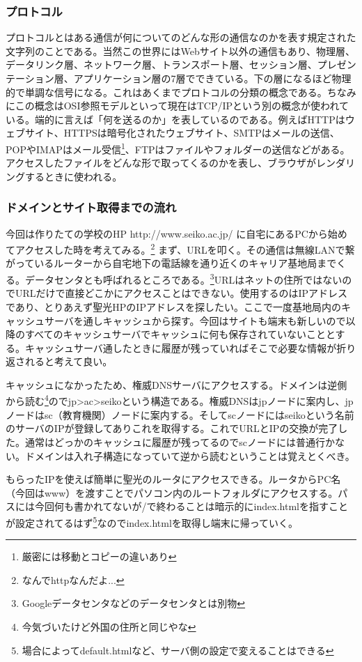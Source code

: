 \documentclass[dvipdfmx,jb5]{jarticle}
\begin{document}
\subsubsection{プロトコル}
プロトコルとはある通信が何についてのどんな形の通信なのかを表す規定された文字列のことである。当然この世界にはWebサイト以外の通信もあり、物理層、データリンク層、ネットワーク層、トランスポート層、セッション層、プレゼンテーション層、アプリケーション層の7層でできている。下の層になるほど物理的で単調な信号になる。これはあくまでプロトコルの分類の概念である。ちなみにこの概念はOSI参照モデルといって現在はTCP/IPという別の概念が使われている。端的に言えば「何を送るのか」を表しているのである。例えばHTTPはウェブサイト、HTTPSは暗号化されたウェブサイト、SMTPはメールの送信、POPやIMAPはメール受信\footnote{厳密には移動とコピーの違いあり}、FTPはファイルやフォルダーの送信などがある。アクセスしたファイルをどんな形で取ってくるのかを表し、ブラウザがレンダリングするときに使われる。
\subsubsection{ドメインとサイト取得までの流れ}
今回は作りたての学校のHP http://www.seiko.ac.jp/ に自宅にあるPCから始めてアクセスした時を考えてみる。\footnote{なんでhttpなんだよ...} まず、URLを叩く。その通信は無線LANで繋がっているルーターから自宅地下の電話線を通り近くのキャリア基地局までくる。データセンタとも呼ばれるところである。\footnote{Googleデータセンタなどのデータセンタとは別物}URLはネットの住所ではないのでURLだけで直接どこかにアクセスことはできない。使用するのはIPアドレスであり、とりあえず聖光HPのIPアドレスを探したい。ここで一度基地局内のキャッシュサーバを通しキャッシュから探す。今回はサイトも端末も新しいので以降のすべてのキャッシュサーバでキャッシュに何も保存されていないこととする。キャッシュサーバ通したときに履歴が残っていればそこで必要な情報が折り返されると考えて良い。

キャッシュになかったため、権威DNSサーバにアクセスする。ドメインは逆側から読む\footnote{今気づいたけど外国の住所と同じやな}のでjp\textgreater\textbar ac\textgreater\textbar seikoという構造である。権威DNSはjpノードに案内し、jpノードはsc（教育機関）ノードに案内する。そしてscノードにはseikoという名前のサーバのIPが登録してありこれを取得する。これでURLとIPの交換が完了した。通常はどっかのキャッシュに履歴が残ってるのでscノードには普通行かない。ドメインは入れ子構造になっていて逆から読むということは覚えとくべき。

もらったIPを使えば簡単に聖光のルータにアクセスできる。ルータからPC名（今回はwww）を渡すことでパソコン内のルートフォルダにアクセスする。パスには今回何も書かれてないが/で終わることは暗示的にindex.htmlを指すことが設定されてるはず\footnote{場合によってdefault.htmlなど、サーバ側の設定で変えることはできる}なのでindex.htmlを取得し端末に帰っていく。
\end{document}

